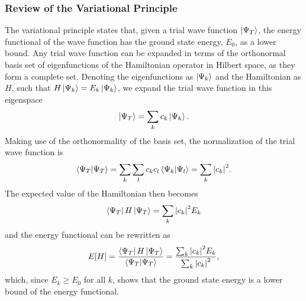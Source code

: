 \subsubsection{Review of the Variational Principle}\label{sec:variational_principle}
The variational principle states that, given a trial wave function $\ket{\Psi_T}$, the energy functional of the wave function has the ground state energy, $E_0$, as a lower bound. Any trial wave function can be expanded in terms of the orthonormal basis set of eigenfunctions of the Hamiltonian operator in Hilbert space, as they form a complete set. Denoting the eigenfunctions as $\ket{\Psi_k}$ and the Hamiltonian as $H$, such that $H\ket{\Psi_k}=E_k\ket{\Psi_k}$, we expand the trial wave function in this eigenspace
\begin{equation*}
    \ket{\Psi_T} = \sum_{k}c_k\ket{\Psi_k}.
\end{equation*}
Making use of the orthonormality of the basis set, the normalization of the trial wave function is 
\begin{equation*}
    \braket{\Psi_T} = \sum_k\sum_l c_kc_l\braket{\Psi_k}{\Psi_l} = \sum_k \abs{c_k}^2.
\end{equation*}
The expected value of the Hamiltonian then becomes
\begin{equation}\label{eq:energy_functional_basis_set}
    \bra{\Psi_T}H\ket{\Psi_T} = \sum_k\abs{c_k}^2E_k
\end{equation}
and the energy functional can be rewritten as 
\begin{equation}
    E[H] = \frac{\bra{\Psi_T}H\ket{\Psi_T}}{\braket{\Psi_T}} = \frac{\sum_k\abs{c_k}^2E_k}{\sum_k\abs{c_k}^2}, 
\end{equation}
which, since $E_k\geq E_0$ for all $k$, shows that the ground state energy is a lower bound of the energy functional.  


